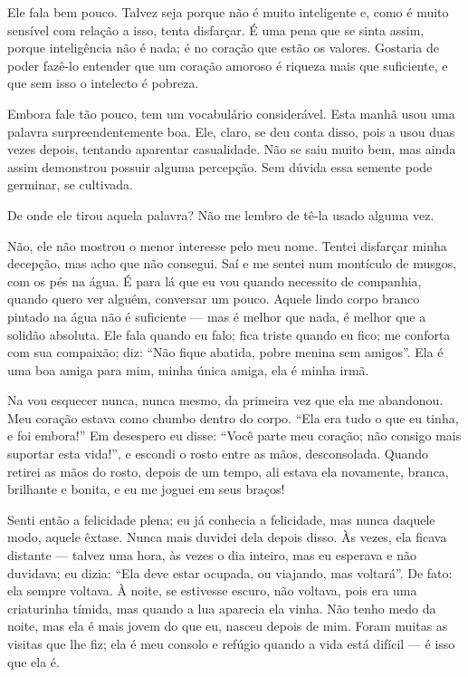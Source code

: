 Ele fala bem pouco. Talvez seja porque não é muito inteligente e, 
como é muito sensível com relação a isso, tenta disfarçar. 
É uma pena que se sinta assim, porque inteligência não é nada; 
é no coração que estão os valores. Gostaria de poder fazê-lo entender 
que um coração amoroso é riqueza mais que suficiente, e que sem isso 
o intelecto é pobreza.

Embora fale tão pouco, tem um vocabulário considerável. Esta manhã
usou uma palavra surpreendentemente boa. Ele, claro, se deu conta
disso, pois a usou duas vezes depois, tentando aparentar casualidade. 
Não se saiu muito bem, mas ainda assim demonstrou possuir alguma 
percepção. Sem dúvida essa semente pode germinar, se cultivada.

De onde ele tirou aquela palavra? Não me lembro de tê-la usado alguma vez.

Não, ele não mostrou o menor interesse pelo meu nome. Tentei disfarçar minha
decepção, mas acho que não consegui. Saí e me sentei num montículo de
musgos, com os pés na água. É para lá que eu vou quando necessito de
companhia, quando quero ver alguém, conversar um pouco. Aquele lindo
corpo branco pintado na água não é suficiente --- mas é melhor que nada, é
melhor que a solidão absoluta. Ele fala quando eu falo; fica triste quando eu
fico; me conforta com sua compaixão; diz: “Não fique abatida, pobre
menina sem amigos”. Ela é uma boa amiga para mim,
minha única amiga, ela é minha irmã.

Na vou esquecer nunca, nunca mesmo, da primeira vez que ela me abandonou. Meu
coração estava como chumbo dentro do corpo. “Ela era tudo o que eu tinha, e
foi embora!” Em desespero eu disse: “Você parte meu coração; não
consigo mais suportar esta vida!”, e escondi o rosto entre as mãos,
desconsolada. Quando retirei as mãos do rosto, depois de um tempo, ali estava ela
novamente, branca, brilhante e bonita, e eu me joguei em seus braços!

Senti então a felicidade plena; eu já conhecia a felicidade, mas nunca daquele modo, 
aquele êxtase. Nunca mais duvidei dela depois disso. Às
vezes, ela ficava distante --- talvez uma hora, às vezes o dia inteiro, mas eu
esperava e não duvidava; eu dizia: “Ela deve estar ocupada, ou viajando,
mas voltará”. De fato: ela sempre voltava. À noite, se estivesse
escuro, não voltava, pois era uma criaturinha tímida, mas quando a lua
aparecia ela vinha. Não tenho medo da noite, mas ela é mais jovem do que
eu, nasceu depois de mim. Foram muitas as visitas que lhe fiz; ela é meu
consolo e refúgio quando a vida está difícil --- é isso que ela é.

